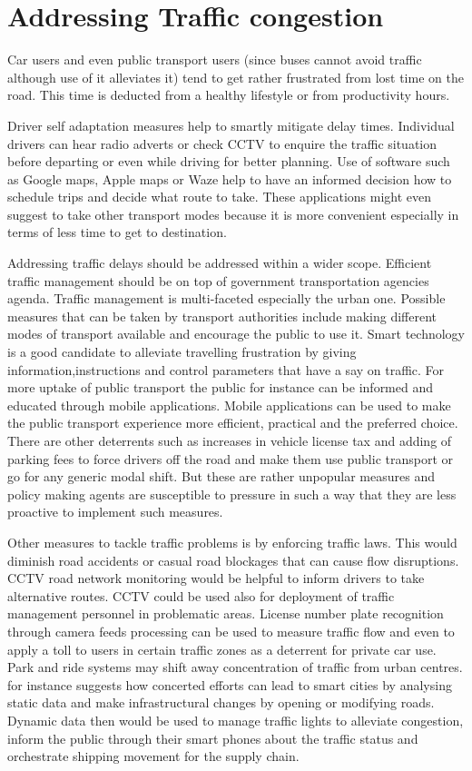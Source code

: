 \documentclass[12pt, a4paper]{report}
\theoremstyle{definition}
\theoremstyle{definition}%
\theoremstyle{definition}%
\theoremstyle{definition}%
\theoremstyle{definition}%
\theoremstyle{definition}%
\begin{document}
\section{Addressing Traffic congestion}

Car users and even public transport users (since buses cannot avoid traffic although use of it alleviates it) tend to get rather frustrated from lost time on the road. This time is deducted from a healthy lifestyle or from productivity hours. 

Driver self adaptation measures help to smartly mitigate delay times. Individual drivers can hear radio adverts or check CCTV to enquire the traffic situation before departing or even while driving for better planning. Use of software such as Google maps, Apple maps or Waze help to have an informed decision how to schedule trips and decide what route to take.  These applications might even suggest to take other transport modes because it is more convenient especially in terms of less time to get to destination.

Addressing traffic delays should be addressed within a wider scope. Efficient traffic management should be on top of government transportation agencies agenda. Traffic management is multi-faceted especially the urban one. Possible measures that can be taken by transport authorities include making different modes of transport available and encourage the public to use it. Smart technology is a good candidate to alleviate travelling frustration by giving information,instructions and control parameters that have a say on traffic. For more uptake of public transport the public for instance can be informed and educated through mobile applications.  Mobile applications can be used to make the public transport experience more efficient, practical and the preferred choice. There are other deterrents such as increases in vehicle license tax and adding of parking fees to force drivers off the road and make them use public transport or go for any generic modal shift. But these are rather unpopular measures and policy making agents are susceptible to pressure in such a way that they are less proactive to implement such measures.

Other measures to tackle traffic problems is by enforcing traffic laws. This would diminish road accidents or casual road blockages that can cause flow disruptions. CCTV road network monitoring would be helpful to inform drivers to take alternative routes. CCTV could be used also for deployment of traffic management personnel in problematic areas. License number plate recognition through camera feeds processing can be used to measure traffic flow and even to apply a toll to users in certain traffic zones as a deterrent for private car use.  Park and ride systems may shift away concentration of traffic from urban centres.  \cite{AlNuaimi2015} for instance suggests how concerted efforts can lead to smart cities by analysing static data and make infrastructural changes by opening or modifying roads. Dynamic data then would be used to manage traffic lights to alleviate congestion, inform the public through their smart phones about the traffic status and orchestrate shipping movement for the supply chain.
\end{document}

